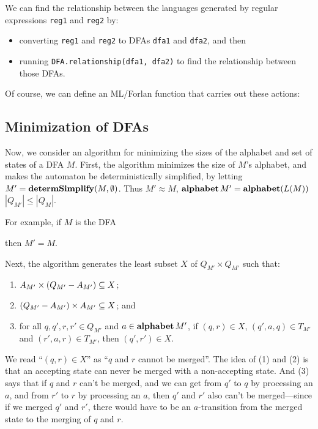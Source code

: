 We can find the relationship between the languages generated by regular
expressions \texttt{reg1} and \texttt{reg2} by:
\begin{itemize}
\item  converting \texttt{reg1} and \texttt{reg2} to DFAs
\texttt{dfa1} and \texttt{dfa2}, and then

\item  running \texttt{DFA.relationship(dfa1, dfa2)} to find
the relationship between those DFAs.
\end{itemize}

Of course, we can define an ML/Forlan function that
carries out these actions:


\subsection{Minimization of DFAs}

%

Now, we consider an algorithm for minimizing the sizes of the alphabet
and set of states of a DFA $M$.  First, the algorithm minimizes the
size of $M$'s alphabet, and makes the automaton be deterministically
simplified, by letting $M'=\mathbf{determSimplify}(M,\emptyset)$.  Thus
$M'\approx M$, $\mathbf{alphabet}\,M'=\mathbf{alphabet}(L(M))$ $|Q_{M'}|\leq|Q_M|$.

For example, if $M$ is the DFA
\begin{center}

\end{center}
then $M'=M$.

Next, the algorithm generates the least subset $X$ of $Q_{M'}\times
Q_{M'}$ such that:
\begin{enumerate}[\quad(1)]
\item $A_{M'}\times(Q_{M'}-A_{M'})\subseteq X$;

\item $(Q_{M'}-A_{M'})\times A_{M'}\subseteq X$; and

\item for all $q,q',r,r'\in Q_{M'}$ and $a\in\mathbf{alphabet}\,M'$,
if $(q,r)\in X$, $(q',a, q)\in T_{M'}$ and $(r',a, r)\in T_{M'}$, then
$(q',r')\in X$.
\end{enumerate}
We read ``$(q,r)\in X$'' as ``$q$ and $r$ cannot be merged''.
The idea of (1) and (2) is that an accepting state can never be merged
with a non-accepting state.  And (3) says that if $q$ and $r$ can't
be merged, and we can get from $q'$ to $q$ by processing an $a$, and
from $r'$ to $r$ by processing an $a$, then
$q'$ and $r'$ also can't be merged---since if we merged $q'$ and $r'$,
there would have to be an $a$-transition from the merged state
to the merging of $q$ and $r$.

